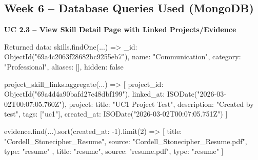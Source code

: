 \documentclass[11pt]{article}
\begin{document}
\subsection*{Week 6 -- Database Queries Used (MongoDB)}

\noindent
\textbf{UC 2.3 -- View Skill Detail Page with Linked Projects/Evidence}
\begin{TerminalBlock}
Returned data:
skills.findOne(...) =>
{
  _id: ObjectId("69a4c2063f28682bc9255eb7"),
  name: "Communication",
  category: "Professional",
  aliases: [],
  hidden: false
}

project_skill_links.aggregate(...) =>
[
  {
    project_id: ObjectId("69a4d4a90bafd27c48dbf199"),
    linked_at: ISODate("2026-03-02T00:07:05.760Z"),
    project: {
      title: "UC1 Project Test",
      description: "Created by test",
      tags: ["uc1"],
      created_at: ISODate("2026-03-02T00:07:05.751Z")
    }
  }
]

evidence.find(...).sort({created_at: -1}).limit(2) =>
[
  {
    title: "Cordell_Stonecipher_Resume",
    source: "Cordell_Stonecipher_Resume.pdf",
    type: "resume"
  },
  {
    title: "resume",
    source: "resume.pdf",
    type: "resume"
  }
]
\end{TerminalBlock}
\end{document}
